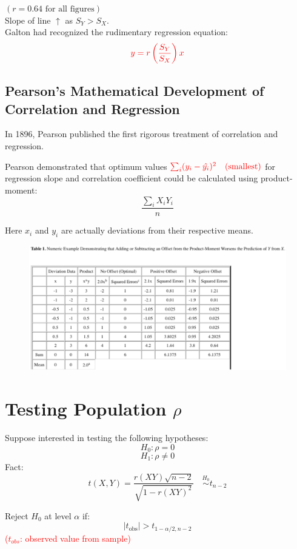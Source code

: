\documentclass[14pt]{extarticle}
\begin{document}
\noindent
$(r = 0.64 \text{ for all figures})$\\
\noindent
Slope of line $\uparrow$ as $S_Y > S_X$.\\
\noindent
Galton had recognized the rudimentary regression equation:
\[
\textcolor{red}{y = r\left(\frac{S_Y}{S_X}\right)x}
\]

\subsection*{Pearson's Mathematical Development of Correlation and Regression}

\noindent
In 1896, Pearson published the first rigorous treatment of correlation and regression.

\noindent
Pearson demonstrated that optimum values $\textcolor{red}{\sum_{i} (y_i - \hat{y_i})^2 \quad \text{(smallest)}}
$ for regression slope and correlation coefficient could be calculated using product-moment:
\[
\frac{\sum_{i} X_i Y_i}{n}
\]

\noindent
Here $x_i$ and $y_i$ are actually deviations from their respective means.

\begin{figure}[H]
    \centering
    \includegraphics[width=1\textwidth]{fig4.png}
\end{figure}

\newpage

\section*{Testing Population $\rho$}
\noindent
Suppose interested in testing the following hypotheses:
\[
H_0: \rho = 0
\]
\[
H_1: \rho \neq 0
\]
\noindent
Fact: 
\[
t(X, Y) = \frac{r(XY)\sqrt{n-2}}{\sqrt{1 - r(XY)^2}} \quad \overset{H_0}{\sim} t_{n-2} 
\]

\noindent
Reject $H_0$ at level $\alpha$ if:
\[
|t_{\text{obs}}| > t_{1-\alpha/2, n-2}
\]
\textcolor{red}{\quad ($t_{obs}$: observed value from sample)}
\end{document}
